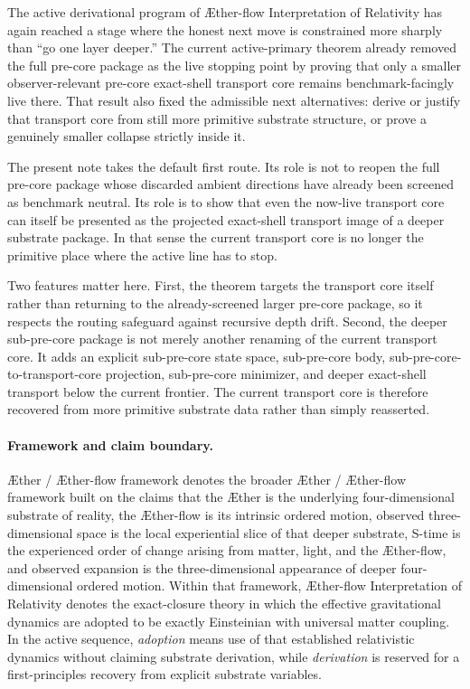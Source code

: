 \documentclass[11pt]{article}
\newcommand{\Aether}{\AE{}ther}
\newcommand{\Aflow}{\AE{}ther-flow}
\newcommand{\TheoryName}{\Aflow{} Interpretation of Relativity}
\newcommand{\TheoryProgram}{\Aether{} / \Aflow{} framework}
\begin{document}
The active derivational program of \TheoryName{} has again reached a stage where the honest next move is constrained more sharply than ``go one layer deeper.'' The current active-primary theorem already removed the full pre-core package as the live stopping point by proving that only a smaller observer-relevant pre-core exact-shell transport core remains benchmark-facingly live there. That result also fixed the admissible next alternatives: derive or justify that transport core from still more primitive substrate structure, or prove a genuinely smaller collapse strictly inside it.

The present note takes the default first route. Its role is not to reopen the full pre-core package whose discarded ambient directions have already been screened as benchmark neutral. Its role is to show that even the now-live transport core can itself be presented as the projected exact-shell transport image of a deeper substrate package. In that sense the current transport core is no longer the primitive place where the active line has to stop.

Two features matter here. First, the theorem targets the transport core itself rather than returning to the already-screened larger pre-core package, so it respects the routing safeguard against recursive depth drift. Second, the deeper sub-pre-core package is not merely another renaming of the current transport core. It adds an explicit sub-pre-core state space, sub-pre-core body, sub-pre-core-to-transport-core projection, sub-pre-core minimizer, and deeper exact-shell transport below the current frontier. The current transport core is therefore recovered from more primitive substrate data rather than simply reasserted.

\paragraph{Framework and claim boundary.}
\TheoryProgram{} denotes the broader \Aether{} / \Aflow{} framework built on the claims that the \Aether{} is the underlying four-dimensional substrate of reality, the \Aflow{} is its intrinsic ordered motion, observed three-dimensional space is the local experiential slice of that deeper substrate, S-time is the experienced order of change arising from matter, light, and the \Aflow{}, and observed expansion is the three-dimensional appearance of deeper four-dimensional ordered motion. Within that framework, \TheoryName{} denotes the exact-closure theory in which the effective gravitational dynamics are adopted to be exactly Einsteinian with universal matter coupling. In the active sequence, \emph{adoption} means use of that established relativistic dynamics without claiming substrate derivation, while \emph{derivation} is reserved for a first-principles recovery from explicit substrate variables.
\end{document}

